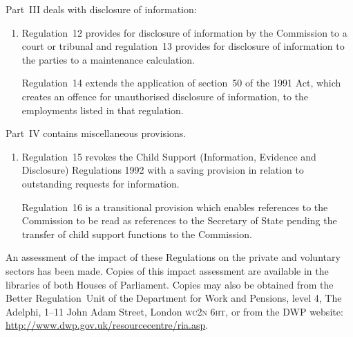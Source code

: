 \documentclass[12pt,a4paper]{article}
\begin{document}
Part~III deals with disclosure of information:
\begin{enumerate}\item[]
Regulation~12 provides for disclosure of information by the Commission to a court or tribunal and regulation~13 provides for disclosure of information to the parties to a maintenance calculation.

Regulation~14 extends the application of section~50 of the 1991 Act, which creates an offence for unauthorised disclosure of information, to the employments listed in that regulation.
\end{enumerate}

Part~IV contains miscellaneous provisions.
\begin{enumerate}\item[]
Regulation~15 revokes the Child Support (Information, Evidence and Disclosure) Regulations 1992 with a saving provision in relation to outstanding requests for information.

Regulation~16 is a transitional provision which enables references to the Commission to be read as references to the Secretary of State pending the transfer of child support functions to the Commission.
\end{enumerate}

An assessment of the impact of these Regulations on the private and voluntary sectors has been made. Copies of this impact assessment are available in the libraries of both Houses of Parliament. Copies may also be obtained from the Better Regulation~Unit of the Department for Work and Pensions, level 4, The Adelphi, 1--11 John Adam Street, London \textsc{\lowercase{WC2N 6HT}}, or from the DWP website: \url{http://www.dwp.gov.uk/resourcecentre/ria.asp}. 
\end{document}
